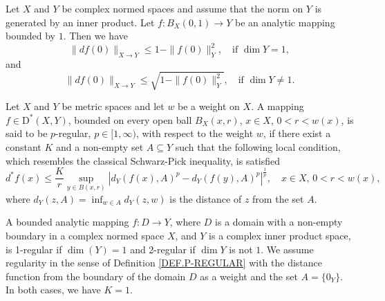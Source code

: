 \documentclass[10pt,a4paper]{amsart}
\begin{document}
\begin{lemma}\label{LE.SCHWARZ-PICK}
Let $X$ and $Y$ be complex normed spaces and assume that the norm on $Y$ is generated by an inner product. Let
$f:B_X(0,1)\to Y$ be an analytic mapping bounded by $1$. Then we have
\begin{equation*}
\|d f(0)\|_{X\to Y}\le {1-\|f(0)\|_Y^2},\quad  \text{if }\dim Y =1,
\end{equation*}
and
\begin{equation*}
\|d f(0)\|_{X\to Y}\le \sqrt{1-\|f(0)\|_Y^2},\quad \text{if }\dim Y\not = 1.
\end{equation*}
\end{lemma}

\begin{definition}\label{DEF.P-REGULAR}
Let $X$ and $Y$ be metric spaces and let $w$ be a weight on $X$. A mapping $f\in\mathrm {D}^\ast(X,Y)$, bounded on
every open ball $B_X(x,r)$, $x\in X$, $0<r<w(x)$, is said to be $p$-regular, $p\in [1,\infty)$, with respect to the
weight $w$, if there exist a constant $K$ and a non-empty set $A\subseteq Y$ such that the following local condition,
which resembles the classical Schwarz-Pick inequality, is satisfied
\begin{equation*}
d^\ast f (x) \le \frac {K}r 
\sup_{y\in B(x,r)} |d_Y(f(x), A) ^p  -  d _Y(f(y), A)^p|^{\frac 1p},
\quad x\in X,\, 0<r<w(x),
\end{equation*}
where   $d_Y(z, A) = \inf_{w\in A} d_Y(z,w)$ is the distance  of $z$ from the set $A$.
\end{definition}

\begin{lemma}
A bounded analytic mapping $f:D\to Y$, where $D$ is a domain with a non-empty boundary in a complex normed space $X$,
and $Y$ is a complex inner product space, is 1-regular if $\dim(Y)=1$ and 2-regular if $\dim Y$ is not $1$. We assume
regularity in the sense of Definition \ref{DEF.P-REGULAR} with the distance function from the boundary of the domain
$D$ as a weight and the set $A = \{0_Y\}$. In both cases, we have $K=1$.
\end{lemma}
\end{document}
